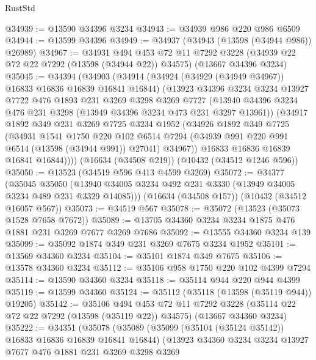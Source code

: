 \begin{lexlean}{RustStd}
\begin{coremodule}
@34939 := @13590 @34396 @3234
@34943 := @34939 @986 @220 @986 @6509
@34944 := @13599 @34396
@34949 := @34937 (@34943 (@13598 (@34944 @986)) @26989)
@34967 := @34931
    @494
    @453
    @72
    @11
    @7292
    @3228
    (@34939 @22 @72 @22 @7292 (@13598 (@34944 @22)) @34575)
    (@13667 @34396 @3234)
@35045 := @34394
    (@34903
      (@34914
        (@34924 (@34929 (@34949 @34967)) @16833 @16836 @16839 @16841 @16844)
        (@13923
          @34396
          @3234
          @3234
          @13927
          @7722
          @476
          @1893
          @231
          @3269
          @3298
          @3269
          @7727
          (@13940 @34396 @3234 @476 @231 @3298 (@13949 @34396 @3234 @473 @231 @3297 @13961))
          (@34917
            @1892
            @349
            @231
            @3269
            @7725
            @3234
            @1952
            (@34926
              @1892
              @349
              @7725
              (@34931
                @1541
                @1750
                @220
                @102
                @6514
                @7294
                (@34939 @991 @220 @991 @6514 (@13598 (@34944 @991)) @27041)
                @34967))
            @16833
            @16836
            @16839
            @16841
            @16844))))
    (@16634 (@34508 @219))
    (@10432 (@34512 @1246 @596))
@35050 := @13523 (@34519 @596 @413 @4599 @3269)
@35072 := @34377
    (@35045
      @35050
      (@13940 @34005 @3234 @492 @231 @3330 (@13949 @34005 @3234 @489 @231 @3329 @14085)))
    (@16634 (@34508 @157))
    (@10432 (@34512 @16057 @567))
@35073 := @34519 @567
@35078 := @35072 (@13523 (@35073 @1528 @7658 @7672))
@35089 := @13705 @34360 @3234 @3234 @1875 @476 @1881 @231 @3269 @7677 @3269 @7686
@35092 := @13555 @34360 @3234 @139
@35099 := @35092 @1874 @349 @231 @3269 @7675 @3234 @1952
@35101 := @13569 @34360 @3234
@35104 := @35101 @1874 @349 @7675
@35106 := @13578 @34360 @3234
@35112 := @35106 @958 @1750 @220 @102 @4399 @7294
@35114 := @13590 @34360 @3234
@35118 := @35114 @944 @220 @944 @4399
@35119 := @13599 @34360
@35124 := @35112 (@35118 (@13598 (@35119 @944)) @19205)
@35142 := @35106
    @494
    @453
    @72
    @11
    @7292
    @3228
    (@35114 @22 @72 @22 @7292 (@13598 (@35119 @22)) @34575)
    (@13667 @34360 @3234)
@35222 := @34351
    (@35078
      (@35089
        (@35099 (@35104 (@35124 @35142)) @16833 @16836 @16839 @16841 @16844)
        (@13923
          @34360
          @3234
          @3234
          @13927
          @7677
          @476
          @1881
          @231
          @3269
          @3298
          @3269

\end{coremodule}
\end{lexlean}
